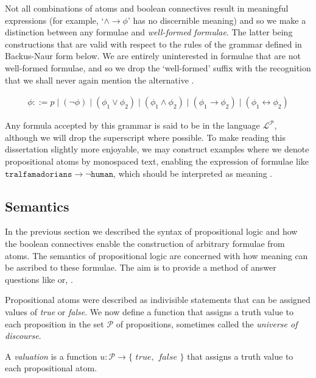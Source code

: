 Not all combinations of atoms and boolean connectives result in meaningful expressions (for example, `$\land \rightarrow \phi$' has no discernible meaning) and so we make a distinction between any formulae and \textit{well-formed formulae}. The latter being constructions that are valid with respect to the rules of the grammar defined in Backus-Naur form below. We are entirely uninterested in formulae that are not well-formed formulae, and so we drop the `well-formed' suffix with the recognition that we shall never again mention the alternative \cite[p. 33]{Huth_Ryan_2004}.

\begin{align}
  \phi ::= p \mid (\neg \phi) \mid (\phi_1 \lor \phi_2) \mid (\phi_1 \land \phi_2) \mid (\phi_1 \rightarrow \phi_2) \mid (\phi_1 \leftrightarrow \phi_2)
\end{align}

Any formula accepted by this grammar is said to be in the language $\mathcal{L}^\mathcal{P}$, although we will drop the superscript where possible.
To make reading this dissertation slightly more enjoyable, we may construct examples where we denote propositional atoms by monospaced text, enabling the expression of formulae like $\texttt{tralfamadorians} \rightarrow \neg \texttt{human}$, which should be interpreted as meaning .

\subsection{Semantics}
\label{subsection:semantics}
In the previous section we described the syntax of propositional logic and how the boolean connectives enable the construction of arbitrary formulae from atoms. The semantics of propositional logic are concerned with how meaning can be ascribed to these formulae. The aim is to provide a method of answer questions like  or, .

Propositional atoms were described as indivisible statements that can be assigned values of \textit{true} or \textit{false}. We now define a function that assigns a truth value to each proposition in the set $\mathcal{P}$ of propositions, sometimes called the \textit{universe of discourse}. 

\begin{definition}
  \label{definition:valuation}  
  A \textit{valuation} is a function \(u : \mathcal{P} \to \{\textit{ true}, \textit{ false }\}\) that assigns a truth value to each propositional atom.
\end{definition}

